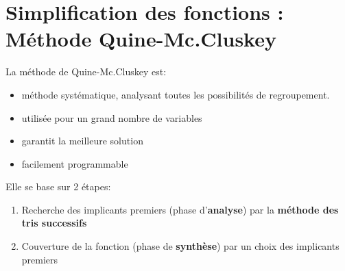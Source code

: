 \section{Simplification des fonctions : Méthode Quine-Mc.Cluskey}
La méthode de Quine-Mc.Cluskey est:
\begin{itemize}
	\item méthode systématique, analysant toutes les possibilités de regroupement. 
	\item utilisée pour un grand nombre de variables
	\item garantit la meilleure solution
	\item facilement programmable
\end{itemize}
Elle se base sur 2 étapes:
\begin{enumerate}
	\item Recherche des implicants premiers (phase d'\textbf{analyse}) par la \textbf{méthode des tris successifs}
	\item Couverture de la fonction (phase de \textbf{synthèse}) par un choix des implicants premiers
\end{enumerate}
